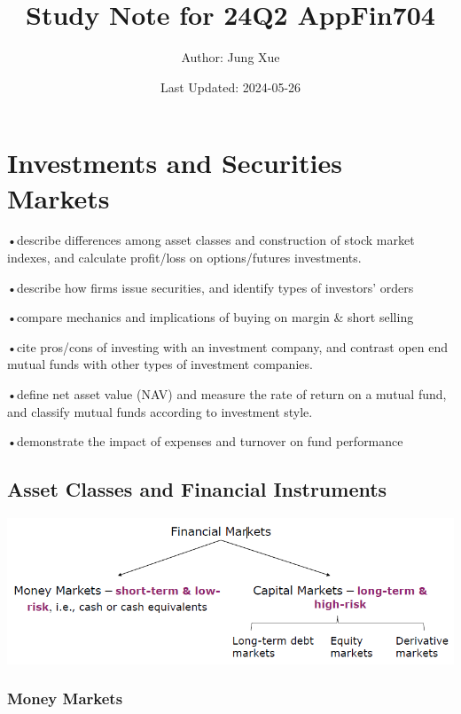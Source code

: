 \documentclass[
]{book}
\title{Study Note for 24Q2 AppFin704}
\author{Author: Jung Xue}
\date{Last Updated: 2024-05-26}
\begin{document}
\maketitle

{
\setcounter{tocdepth}{1}
\tableofcontents
}
\hypertarget{ch1}{%
\chapter{Investments and Securities Markets}\label{ch1}}

•describe differences among asset classes and construction of stock market indexes, and calculate profit/loss on options/futures investments.

•describe how firms issue securities, and identify types of investors' orders

•compare mechanics and implications of buying on margin \& short selling

•cite pros/cons of investing with an investment company, and contrast open end mutual funds with other types of investment companies.

•define net asset value (NAV) and measure the rate of return on a mutual fund, and classify mutual funds according to investment style.

•demonstrate the impact of expenses and turnover on fund performance

\hypertarget{asset-classes-and-financial-instruments}{%
\section{Asset Classes and Financial Instruments}\label{asset-classes-and-financial-instruments}}

\includegraphics{Resources/Financialmarkets.png}

\hypertarget{money-markets}{%
\subsection{Money Markets}\label{money-markets}}
\end{document}
